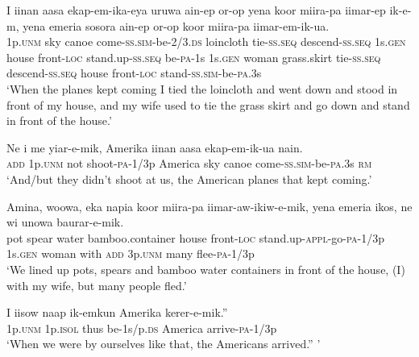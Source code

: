 \ea
\gll  I  iinan  aasa  ekap-em-ika-eya  uruwa  ain-ep             or-op  yena  koor  miira-pa  iimar-ep                     ik-e-m,  yena  emeria  sosora  ain-ep  or-op                        koor  miira-pa  iimar-em-ik-ua. \\
1p.\textsc{unm}  sky  canoe  come-\textsc{ss}.\textsc{sim}-be-2/3.\textsc{ds}  loincloth  tie-\textsc{ss.seq} descend-\textsc{ss.seq}  1s.\textsc{gen}  house  front-\textsc{loc}  stand.up-\textsc{ss.seq} be-\textsc{pa}-1s  1s.\textsc{gen}  woman  grass.skirt  tie-\textsc{ss.seq}  descend-\textsc{ss.seq}    house  front-\textsc{loc}  stand-\textsc{ss}.\textsc{sim}-be-\textsc{pa}.3s \\






\glt ‘When the planes kept coming I tied the loincloth and went down and stood in front of my house, and my wife used to tie the grass skirt and go down and stand in front of the house.’ \\
\z


\ea
\gll  Ne  i  me  yiar-e-mik,  Amerika  iinan  aasa      ekap-em-ik-ua  nain. \\
\textsc{add}  1p.\textsc{unm}  not  shoot-\textsc{pa}-1/3p  America  sky  canoe    come-\textsc{ss}.\textsc{sim}-be-\textsc{pa}.3s  \textsc{rm} \\


\glt ‘And/but they didn’t shoot at us, the American planes that kept coming.’ \\
\z


\ea
\gll  Amina,  woowa,  eka  napia  koor  miira-pa       iimar-aw-ikiw-e-mik,  yena  emeria  ikos,  ne        wi  unowa  baurar-e-mik. \\
pot  spear  water  bamboo.container  house  front-\textsc{loc}  stand.up-\textsc{appl}-go-\textsc{pa}-1/3p  1s.\textsc{gen}  woman  with  \textsc{add}   3p.\textsc{unm}  many  flee-\textsc{pa}-1/3p \\




\glt ‘We lined up pots, spears and bamboo water containers in front of the house, (I) with my wife, but many people fled.’ \\
\z


\ea
\gll  I  iisow  naap  ik-emkun  Amerika  kerer-e-mik.” \\
1p.\textsc{unm}  1p.\textsc{isol}  thus  be-1s/p.\textsc{ds}  America  arrive-\textsc{pa}-1/3p \\
\glt ‘When we were by ourselves like that, the Americans arrived.” ’ \\
\z


